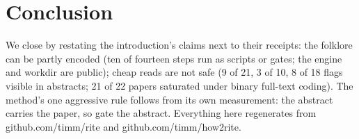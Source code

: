 \section{Conclusion}

We close by restating the introduction's claims next to their
receipts: the folklore can be partly encoded (ten of fourteen steps
run as scripts or gates; the engine and workdir are public); cheap
reads are not safe (9 of 21, 3 of 10, 8 of 18 flags visible in
abstracts; 21 of 22 papers saturated under binary full-text coding).
The method's one aggressive rule follows from its own measurement: the
abstract carries the paper, so gate the abstract.
Everything here regenerates from github.com/timm/rite and
github.com/timm/how2rite.
